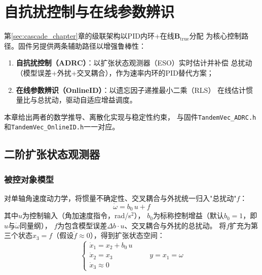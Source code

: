
\section{自抗扰控制与在线参数辨识}
\label{sec:adrc_onlineid}

第\ref{sec:cascade_chapter}章的级联架构以PID内环+在线$\mathbf{B}_{\mathrm{true}}$分配
为核心控制路径。固件另提供两条辅助路径以增强鲁棒性：
\begin{enumerate}[label=(\arabic*)]
    \item \textbf{自抗扰控制（ADRC）}：以扩张状态观测器（ESO）实时估计并补偿
          总扰动（模型误差+外扰+交叉耦合），作为速率内环的PID替代方案；
    \item \textbf{在线参数辨识（OnlineID）}：以遗忘因子递推最小二乘（RLS）
          在线估计惯量比与总扰动，驱动自适应增益调度。
\end{enumerate}
本章给出两者的数学推导、离散化实现与稳定性约束，
与固件\texttt{TandemVec\_ADRC.h}和\texttt{TandemVec\_OnlineID.h}一一对应。

\subsection{二阶扩张状态观测器}
\label{sec:eso2}

\subsubsection{被控对象模型}

对单轴角速度动力学，将惯量不确定性、交叉耦合与外扰统一归入"总扰动"$f$：
\begin{equation}
    \dot{\omega} = b_0\,u + f
    \label{eq:adrc_plant}
\end{equation}
其中$u$为控制输入（角加速度指令，rad/s$^2$），
$b_0$为标称控制增益（默认$b_0=1$，即$u$与$\dot\omega$同量纲），
$f$为包含模型误差$\Delta b\cdot u$、交叉耦合与外扰的总扰动。
将$f$扩充为第三个状态$x_3=f$（假设$\dot f\approx0$），得到扩张状态空间：
\begin{equation}
    \begin{cases}
        \dot{x}_1 = x_2 + b_0\,u \\
        \dot{x}_2 = x_3 \\
        \dot{x}_3 \approx 0
    \end{cases}
    \qquad
    y = x_1 = \omega
    \label{eq:eso_plant}
\end{equation}

